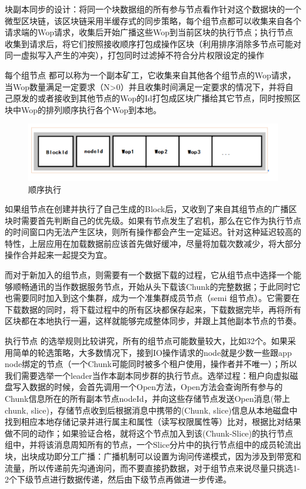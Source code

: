 \documentclass[a4paper,12pt]{article}
\begin{document}
块副本同步的设计：将同一个块数据组的所有参与节点看作针对这个数据块的一个微型区块链，该区块链采用半缓存式的同步策略，每个组节点都可以收集来自各个请求端的Wop请求，收集后开始广播这些Wop到当前区块的执行节点；执行节点收集到请求后，将它们按照接收顺序打包成操作区块（利用排序消除多节点可能对同一虚拟写入产生的冲突），打包同时过滤掉不符合分片权限设定的操作

每个组节点 都可以称为一个副本矿工，它收集来自其他各个组节点的Wop请求，当Wop数量满足一定要求（N>0）并且收集时间满足一定要求的情况下，并将自己原发的或者接收到其他节点的Wop的Id打包成区块广播给其它节点，同时按照区块中Wop的排列顺序执行各个Wop到本地。


\begin {figure} [htbp]
\centering \includegraphics [width = 5in] {pic_cn/execution_sequence.png}
\caption {顺序执行} \label {fig: d11}
\end {figure}


如果组节点在创建并执行了自己生成的Block后，又收到了来自其组节点的广播区块时需要首先判断自己的优先级。如果有节点发生了宕机，那么在它作为执行节点的时间窗口内无法产生区块，则所有操作都会产生一定延迟。针对这种延迟较高的特性，上层应用在加载数据前应该首先做好缓冲，尽量将加载次数减少，将大部分操作合并起来一起提交为宜。

而对于新加入的组节点，则需要有一个数据下载的过程，它从组节点中选择一个能够顺畅通讯的当作数据服务节点，开始从头下载该Chunk的完整数据；于此同时它也需要同时加入到这个集群，成为一个准集群成员节点（semi 组节点）。它需要在下载数据的同时，将下载过程中的所有区块都保存起来，下载数据完毕，再将所有区块都在本地执行一遍，这样就能够完成整体同步，并跟上其他副本节点的节奏。

执行节点 的选举规则比较讲究，所有的组节点可能数量较大，比如32个。如果采用简单的轮选策略，大多数情况下，接到IO操作请求的node就是少数一些跟app node绑定的节点（一个Chunk可能同时被多个租户使用，操作者并不唯一）；所以我们需要选举一个leader当作本副本同步群的执行节点。选举过程：租户向虚拟磁盘写入数据的时候，会首先调用一个Open方法，Open方法会查询所有参与的Chunk信息所在的所有副本节点nodeId，并向这些存储节点发送Open消息(带上chunk, slice)，存储节点收到后根据消息中携带的(Chunk, slice)信息从本地磁盘中找到相应本地存储记录并进行属主和属性（读写权限属性等）比对，根据比对结果做不同的动作；如果验证合格，就将这个节点加入到该(Chunk-Slice)的执行节点 组中，并将该消息周知所有的节点，一个Slice分片中的执行节点组中的成员轮流出块，出块成功即分工广播：广播机制可以设置为询问传递模式，因为涉及到带宽和流量，所以传递前先沟通询问，而不要直接扔数据，对于组节点来说尽量只挑选1-2个下级节点进行数据传递，然后由下级节点再做进一步传递。
\end{document}
